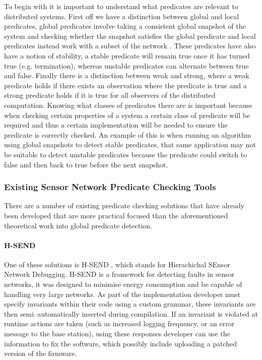 To begin with it is important to understand what predicates are relevant to distributed systems. First off we have a distinction between global and local predicates, global predicates involve taking a consistent global snapshot of the system and checking whether the snapshot satisfies the global predicate \cite{277788} and local predicates instead work with a subset of the network \cite{553309}. These predicates have also have a notion of stability, a stable predicate will remain true once it has turned true (e.g. termination), whereas unstable predicates can alternate between true and false. Finally there is a distinction between weak and strong, where a weak predicate holds if there exists an observation where the predicate is true and a strong predicate holds if it is true for all observers of the distributed computation\cite{553309,Cooper:1991:CDG:127695.122774}. Knowing what classes of predicates there are is important because when checking certain properties of a system a certain class of predicate will be required and thus a certain implementation will be needed to ensure the predicate is correctly checked. An example of this is when running an algorithm using global snapshots to detect stable predicates, that same application may not be suitable to detect unstable predicates because the predicate could switch to false and then back to true before the next snapshot.

\subsubsection{Existing Sensor Network Predicate Checking Tools}

There are a number of existing predicate checking solutions that have already been developed that are more practical focused than the aforementioned theoretical work into global predicate detection.

\paragraph{H-SEND} One of these solutions is H-SEND \cite{herbert2007adaptive}, which stands for Hierachichal SEnsor Network Debugging. H-SEND is a framework for detecting faults in sensor networks, it was designed to minimise energy consumption and be capable of handling very large networks. As part of the implementation developer must specify invariants within their code using a custom grammar, these invariants are then semi--automatically inserted during compilation. If an invariant is violated at runtime actions are taken (such as increased logging frequency, or an error message to the base station), using these responses developer can use the information to fix the software, which possibly include uploading a patched version of the firmware.

